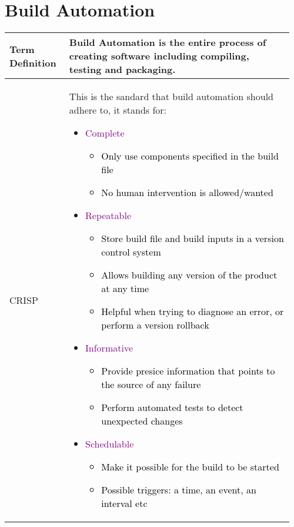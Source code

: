 \documentclass[main.tex,fontsize=8pt,paper=a4,paper=portrait,DIV=calc,]{scrartcl}
\begin{document}
\begin{table}[ht!]
\section{Build Automation}
\begin{tabular}{|m{0.2\linewidth}|m{0.755\linewidth}|}
\hline
Term Definition & 
Build Automation is the entire process of creating software including \textbf{compiling, testing and packaging.}\\
\hline
CRISP &
This is the sandard that build automation should adhere to, it stands for:\newline
\begin{itemize}
\item \textcolor{purple}{Complete}\newline
  \begin{itemize}
  \item \textcolor{black}{Only use components specified in the build file}
  \item \textcolor{black}{No human intervention is allowed/wanted}
  \end{itemize} 
\item \textcolor{purple}{Repeatable}\newline
  \begin{itemize}
  \item \textcolor{black}{Store build file and build inputs in a version control system}
  \item \textcolor{black}{Allows building any version of the product at any time}
  \item \textcolor{black}{Helpful when trying to diagnose an error, or perform a version rollback}
  \end{itemize} 
\item \textcolor{purple}{Informative}\newline
  \begin{itemize}
  \item \textcolor{black}{Provide presice information that points to the source of any failure}
  \item \textcolor{black}{Perform automated tests to detect unexpected changes}
  \end{itemize} 
\item \textcolor{purple}{Schedulable}\newline
\begin{itemize}
  \item \textcolor{black}{Make it possible for the build to be started}
  \item \textcolor{black}{Possible triggers: a time, an event, an interval etc}

\end{itemize}
\end{itemize}
\end{tabular}
\end{table}
\end{document}
